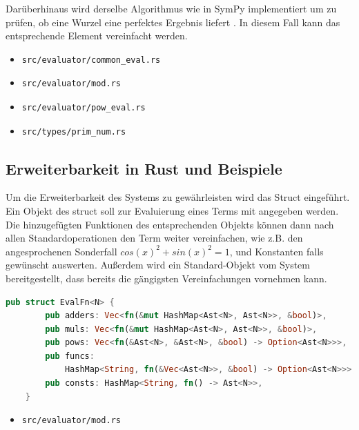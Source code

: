 \documentclass[11pt,a4paper, ngerman]{article}
\begin{document}
Darüberhinaus wird derselbe Algorithmus wie in SymPy implementiert um zu prüfen, ob eine Wurzel eine perfektes Ergebnis liefert \cite{SymPyNewton}. In diesem Fall kann das entsprechende Element vereinfacht werden.

\begin{itemize}
    \item \begin{verbatim}src/evaluator/common_eval.rs\end{verbatim}
    \item \begin{verbatim}src/evaluator/mod.rs\end{verbatim}
    \item \begin{verbatim}src/evaluator/pow_eval.rs\end{verbatim}
    \item \begin{verbatim}src/types/prim_num.rs\end{verbatim}
\end{itemize}

\label{sec:kapErRustUndBei}
\subsection{Erweiterbarkeit in Rust und Beispiele}
Um die Erweiterbarkeit des Systems zu gewährleisten wird das Struct  eingeführt. Ein Objekt des struct soll zur Evaluierung eines Terms mit angegeben werden. Die hinzugefügten Funktionen des entsprechenden Objekts können dann nach allen Standardoperationen den Term weiter vereinfachen, wie z.B. den angesprochenen Sonderfall $cos(x)^2+sin(x)^2 = 1$, und Konstanten falls gewünscht auswerten. Außerdem wird ein Standard-Objekt vom System bereitgestellt, dass bereits die gängigsten Vereinfachungen vornehmen kann.

\begin{lstlisting}[language=rust, caption={Defintion EvalFn}]
    pub struct EvalFn<N> {
        pub adders: Vec<fn(&mut HashMap<Ast<N>, Ast<N>>, &bool)>,
        pub muls: Vec<fn(&mut HashMap<Ast<N>, Ast<N>>, &bool)>,
        pub pows: Vec<fn(&Ast<N>, &Ast<N>, &bool) -> Option<Ast<N>>>,
        pub funcs: 
            HashMap<String, fn(&Vec<Ast<N>>, &bool) -> Option<Ast<N>>>,
        pub consts: HashMap<String, fn() -> Ast<N>>,
    }
\end{lstlisting}

\begin{itemize}
    \item \begin{verbatim}src/evaluator/mod.rs\end{verbatim}
\end{itemize}
\end{document}
